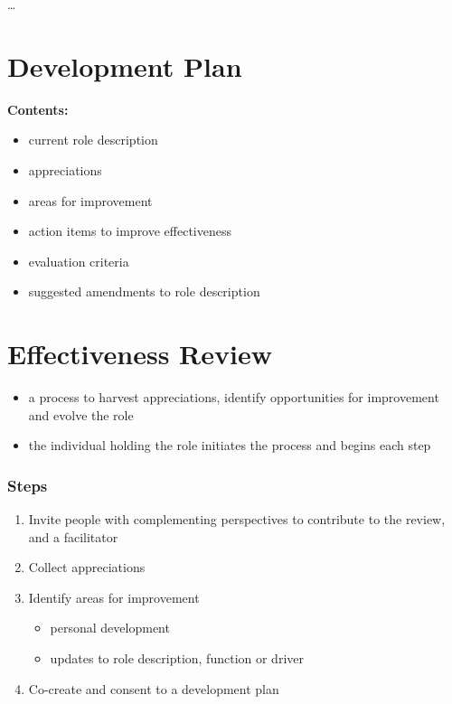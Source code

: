 {\ldots}

\section{Development Plan}
\label{developmentplan}

\textbf{Contents:}

\begin{itemize}
\item current role description

\item appreciations

\item areas for improvement

\item action items to improve effectiveness

\item evaluation criteria

\item suggested amendments to role description

\end{itemize}

\section{Effectiveness Review}
\label{effectivenessreview}

\begin{itemize}
\item a process to harvest appreciations, identify opportunities for improvement and evolve the role

\item the individual holding the role initiates the process and begins each step

\end{itemize}

\subsubsection{Steps}
\label{steps}

\begin{enumerate}
\item Invite people with complementing perspectives to contribute to the review, and a facilitator

\item Collect appreciations

\item Identify areas for improvement

\begin{itemize}
\item personal development

\item updates to role description, function or driver

\end{itemize}

\item Co-create and consent to a development plan

\end{enumerate}

